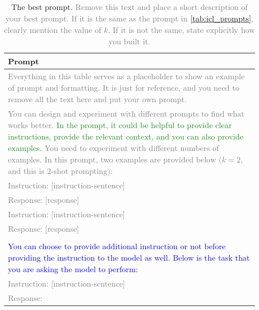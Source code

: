 \documentclass{article}
\begin{document}
\begin{table}[h!]
\centering
\begin{tabular}{p{13.5cm}}
\toprule
\textbf{Prompt} \\
\midrule
    \textcolor{gray}{Everything in this table serves as a placeholder to show an example of prompt and formatting. It is just for reference, and you need to remove all the text here and put your own prompt.} \\
    \textcolor{gray}{You can design and experiment with different prompts to find what works better.} \textcolor{ForestGreen}{In the prompt, it could be helpful to provide clear instructions, provide the relevant context, and you can also provide examples.} \textcolor{gray}{You need to experiment with different numbers of examples. In this prompt, two examples are provided below ($k = 2$, and this is 2-shot prompting):} \\
   \textcolor{gray}{Instruction: [instruction-sentence]} \\
    \textcolor{gray}{Response: [response]} \\
    \textcolor{gray}{Instruction: [instruction-sentence]} \\
    \textcolor{gray}{Response: [response]} \\
    \\
   \textcolor{Blue}{You can choose to provide additional instruction or not before providing the instruction to the model as well. Below is the task that you are asking the model to perform:} \\
    \textcolor{gray}{Instruction: [instruction-sentence]} \\
    \textcolor{gray}{Response: } \\
\bottomrule
\end{tabular}
\caption{The best prompt.
{\textcolor{gray}{Remove this text and place a short description of your best prompt. If it is the same as the prompt in \autoref{tab:icl_prompts}, clearly mention the value of $k$. If it is not the same, state explicitly how you built it.}}
}
\label{tab:best_prompt}
\end{table}
\end{document}
